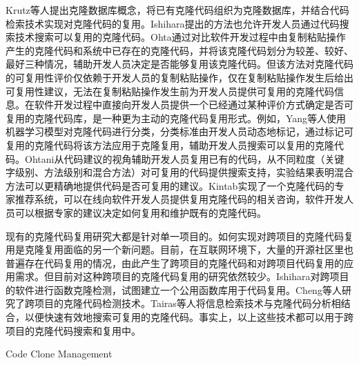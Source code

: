 Krutz等人提出克隆数据库概念，将已有克隆代码组织为克隆数据库，并结合代码检索技术实现对克隆代码的复用\cite{krutz2014code}。Ishihara提出的方法也允许开发人员通过代码搜索技术搜索可以复用的克隆代码\cite{ishihara2013reusing}。Ohta通过对比软件开发过程中由复制粘贴操作产生的克隆代码和系统中已存在的克隆代码，并将该克隆代码划分为较差、较好、最好三种情况，辅助开发人员决定是否能够复用该克隆代码\cite{ohta2015source}。但该方法对克隆代码的可复用性评价仅依赖于开发人员的复制粘贴操作，仅在复制粘贴操作发生后给出可复用性建议，无法在复制粘贴操作发生前为开发人员提供可复用的克隆代码信息。在软件开发过程中直接向开发人员提供一个已经通过某种评价方式确定是否可复用的克隆代码库，是一种更为主动的克隆代码复用形式。例如，Yang\cite{yang2015classification}等人使用机器学习模型对克隆代码进行分类，分类标准由开发人员动态地标记，通过标记可复用的克隆代码将该方法应用于克隆复用，辅助开发人员搜索可以复用的克隆代码。Ohtani从代码建议的视角辅助开发人员复用已有的代码，从不同粒度（关键字级别、方法级别和混合方法）对可复用的代码提供搜索支持，实验结果表明混合方法可以更精确地提供代码是否可复用的建议\cite{ohtani2015level}。Kintab实现了一个克隆代码的专家推荐系统，可以在线向软件开发人员提供复用克隆代码的相关咨询，软件开发人员可以根据专家的建议决定如何复用和维护既有的克隆代码\cite{kintab2014recommending}。


现有的克隆代码复用研究大都是针对单一项目的。如何实现对跨项目的克隆代码复用是克隆复用面临的另一个新问题。目前，在互联网环境下，大量的开源社区里也普遍存在代码复用的情况，由此产生了跨项目的克隆代码和对跨项目代码复用的应用需求。但目前对这种跨项目的克隆代码复用的研究依然较少。Ishihara对跨项目的软件进行函数克隆检测，试图建立一个公用函数库用于代码复用\cite{ishihara2012inter}。Cheng等人研究了跨项目的克隆代码检测技术\cite{cheng2016feasibility}。Tairas等人将信息检索技术与克隆代码分析相结合，以便快速有效地搜索可复用的克隆代码\cite{tairas2009information}。事实上，以上这些技术都可以用于跨项目的克隆代码搜索和复用中。

{Code Clone Management}


